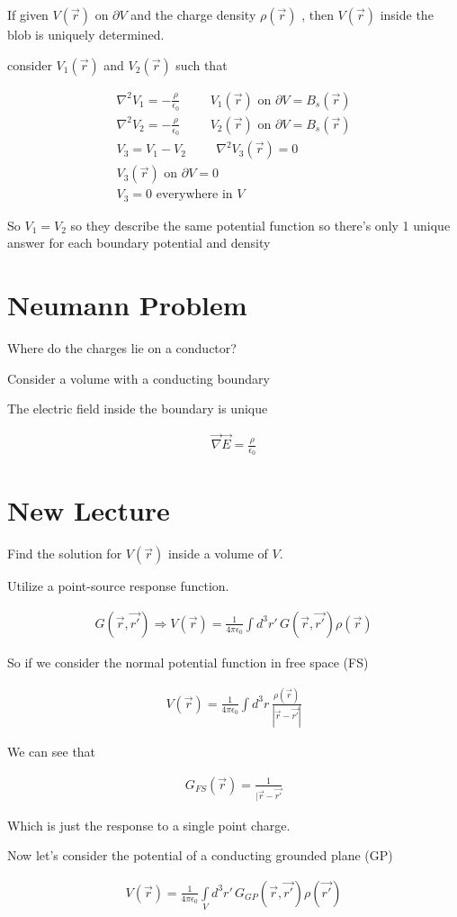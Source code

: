 \documentclass[fleqn]{report}
\newcommand{\hp}{\hspace{1cm}}
\newcommand{\del}{\partial}
\newcommand{\equations} [1] {
\begin{gather*}
#1
\end{gather*}
}
\begin{document}
If given $V(\vec r)$ on $\del V$ and the charge density $\rho(\vec r)$
, then $V(\vec r)$ inside the blob is uniquely determined. 

consider $V_1(\vec r)$ and $V_2(\vec r)$ such that 
\equations{
    \nabla^2 V_1 = - \frac{\rho}{\epsilon_0}
    \hp 
    V_1(\vec r) \textrm{ on } \del V = B_s(\vec r)
    \\
    \nabla^2 V_2 = - \frac{\rho}{\epsilon_0}
    \hp 
    V_2(\vec r) \textrm{ on } \del V = B_s(\vec r)
    \\
    V_3 = V_1 - V_2 
    \hp 
    \nabla^2 V_3(\vec r) = 0 
    \\
    V_3(\vec r) \textrm{ on } \del V = 0 
    \\
    V_3 = 0 \textrm{ everywhere in } V 
}
So $V_1 = V_2$ so they describe the same potential function so 
there's only 1 unique answer for each boundary potential and density 

\section{Neumann Problem}
Where do the charges lie on a conductor?

Consider a volume with a conducting boundary

The electric field inside the boundary is unique 

\equations{
    \vec \nabla \vec E = \frac{\rho}{\epsilon_0}
}

\section{New Lecture}
Find the solution for $V(\vec r)$ inside a volume of $V$.

Utilize a point-source response function. 
\equations{
    G(\vec r, \vec{r'})
    \Rightarrow 
    V(\vec r) 
    =
    \frac{1}{4 \pi \epsilon_0}
    \int d^3 r' \, 
    G(\vec r, \vec{r'}) \rho(\vec r)
}
So if we consider the normal potential function in free space (FS)
\equations{
    V(\vec r) = \frac{1}{4 \pi \epsilon_0} 
    \int d^3 r \,
    \frac{\rho(\vec r)}{|\vec r - \vec{r'}|}
}
We can see that 
\equations{
    G_{FS}(\vec r)
    =
    \frac{1}{|\vec r - \vec{r'}}
}
Which is just the response to a single point charge. 

Now let's consider the potential of a conducting grounded plane (GP)
\equations{
    V(\vec r) = \frac{1}{4 \pi \epsilon_0}
    \int\limits_{V} d^3 r' \, 
    G_{GP} (\vec r, \vec{r'}) \rho(\vec{r'})
}
\end{document}
